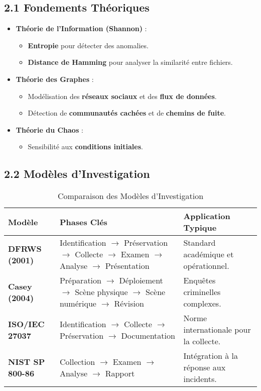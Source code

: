 \documentclass[12pt, a4paper]{report}
\begin{document}
\subsection*{2.1 Fondements Théoriques}
\begin{itemize}
    \item \textbf{Théorie de l’Information (Shannon)} :
    \begin{itemize}
        \item \textbf{Entropie} pour détecter des anomalies.
        \item \textbf{Distance de Hamming} pour analyser la similarité entre fichiers.
    \end{itemize}
    \item \textbf{Théorie des Graphes} :
    \begin{itemize}
        \item Modélisation des \textbf{réseaux sociaux} et des \textbf{flux de données}.
        \item Détection de \textbf{communautés cachées} et de \textbf{chemins de fuite}.
    \end{itemize}
    \item \textbf{Théorie du Chaos} :
    \begin{itemize}
        \item Sensibilité aux \textbf{conditions initiales}.
    \end{itemize}
\end{itemize}

\subsection*{2.2 Modèles d’Investigation}
\begin{table}[h]
    \centering
    \caption{Comparaison des Modèles d’Investigation}
    \begin{tabularx}{\textwidth}{|>{\bfseries}l|X|X|}
        \hline
        Modèle & Phases Clés & Application Typique \\ \hline
        DFRWS (2001) &
        Identification $\rightarrow$ Préservation $\rightarrow$ Collecte $\rightarrow$ Examen $\rightarrow$ Analyse $\rightarrow$ Présentation &
        Standard académique et opérationnel. \\ \hline
        Casey (2004) &
        Préparation $\rightarrow$ Déploiement $\rightarrow$ Scène physique $\rightarrow$ Scène numérique $\rightarrow$ Révision &
        Enquêtes criminelles complexes. \\ \hline
        ISO/IEC 27037 &
        Identification $\rightarrow$ Collecte $\rightarrow$ Préservation $\rightarrow$ Documentation &
        Norme internationale pour la collecte. \\ \hline
        NIST SP 800-86 &
        Collection $\rightarrow$ Examen $\rightarrow$ Analyse $\rightarrow$ Rapport &
        Intégration à la réponse aux incidents. \\ \hline
    \end{tabularx}
\end{table}
\end{document}

